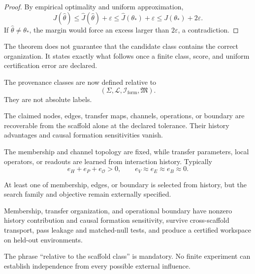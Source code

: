 \begin{proof}
By empirical optimality and uniform approximation,
\[
J(\widehat\theta)
\leq
\widehat J(\widehat\theta)+\varepsilon
\leq
\widehat J(\theta_*)+\varepsilon
\leq
J(\theta_*)+2\varepsilon.
\]
If \(\widehat\theta\neq\theta_*\), the margin would force an excess larger than
\(2\varepsilon\), a contradiction.
\end{proof}

The theorem does not guarantee that the candidate class contains the correct
organization. It states exactly what follows once a finite class, score, and
uniform certification error are declared.


The provenance classes are now defined relative to
\[
(\Sigma,\mathcal L,\mathcal I_{\mathrm{form}},\mathfrak M).
\]
They are not absolute labels.

\begin{description}[leftmargin=2.1em,style=nextline]
\item[Exogenously scaffolded.]
The claimed nodes, edges, transfer maps, channels, operations, or boundary are
recoverable from the scaffold alone at the declared tolerance. Their history
advantages and causal formation sensitivities vanish.

\item[Adaptively parameterized.]
The membership and channel topology are fixed, while transfer parameters,
local operators, or readouts are learned from interaction history. Typically
\[
e_H+e_P+e_{\mathcal O}>0,
\qquad
e_V\approx e_E\approx e_B\approx0.
\]

\item[Structurally adaptive.]
At least one of membership, edges, or boundary is selected from history, but
the search family and objective remain externally specified.

\item[Endogenously constituted relative to the scaffold class.]
Membership, transfer organization, and operational boundary have nonzero
history contribution and causal formation sensitivity, survive cross-scaffold
transport, pass leakage and matched-null tests, and produce a certified
workspace on held-out environments.
\end{description}

The phrase ``relative to the scaffold class'' is mandatory. No finite
experiment can establish independence from every possible external influence.

